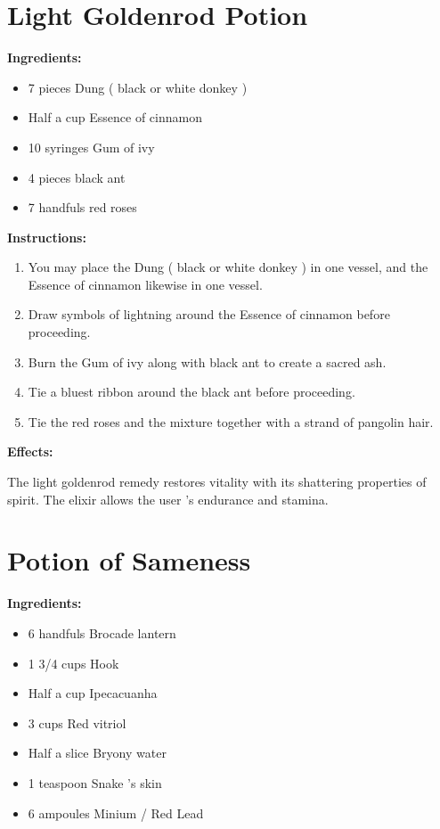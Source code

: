 \documentclass{article}
\begin{document}
\newpage
\section*{Light Goldenrod Potion}

\textbf{Ingredients:}

\begin{itemize}
  \item 7 pieces Dung ( black or white donkey )
  \item Half a cup Essence of cinnamon
  \item 10 syringes Gum of ivy
  \item 4 pieces black ant
  \item 7 handfuls red roses
\end{itemize}

\textbf{Instructions:}

\begin{enumerate}
  \item You may place the Dung ( black or white donkey ) in one vessel, and the Essence of cinnamon likewise in one vessel.
  \item Draw symbols of lightning around the Essence of cinnamon before proceeding.
  \item Burn the Gum of ivy along with black ant to create a sacred ash.
  \item Tie a bluest ribbon around the black ant before proceeding.
  \item Tie the red roses and the mixture together with a strand of pangolin hair.
\end{enumerate}

\textbf{Effects:}

The light goldenrod remedy restores vitality with its shattering properties of spirit. The elixir allows the user 's endurance and stamina.

\newpage
\section*{Potion of Sameness}

\textbf{Ingredients:}

\begin{itemize}
  \item 6 handfuls Brocade lantern
  \item 1 3/4 cups Hook
  \item Half a cup Ipecacuanha
  \item 3 cups Red vitriol
  \item Half a slice Bryony water
  \item 1 teaspoon Snake 's skin
  \item 6 ampoules Minium / Red Lead
\end{itemize}
\end{document}
